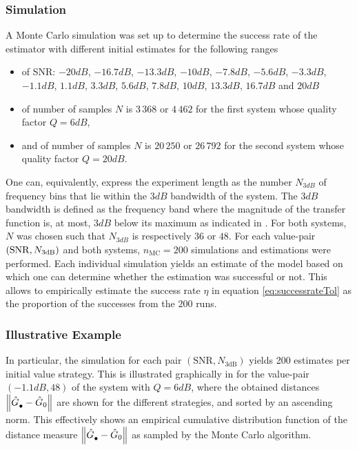 \subsubsection{Simulation}
A Monte Carlo simulation was set up to determine the success rate of the estimator with different initial estimates for the following ranges %
\begin{itemize}
\item of SNR: 
              $-20   \unit{dB}$, 
              $-16.7 \unit{dB}$, 
              $-13.3 \unit{dB}$, 
              $-10   \unit{dB}$, 
              $- 7.8 \unit{dB}$, 
              $- 5.6 \unit{dB}$, 
              $- 3.3 \unit{dB}$, 
              $- 1.1 \unit{dB}$, 
              $  1.1 \unit{dB}$, 
              $  3.3 \unit{dB}$, 
              $  5.6 \unit{dB}$, 
              $  7.8 \unit{dB}$, 
              $ 10   \unit{dB}$, 
              $ 13.3 \unit{dB}$, 
              $ 16.7 \unit{dB}$ and
              $ 20   \unit{dB}$
\item of number of samples $N$ is $3\,368$ or $4\,462$ for the first system whose quality factor $Q= 6 \unit{dB}$,
\item and of number of samples $N$ is $20\,250$ or $26\,792$ for the second system whose quality factor $Q = 20\unit{dB}$.
\end{itemize}
One can, equivalently, express the experiment length as the number $N_{3\unit{dB}}$ of frequency bins that lie within the $3\unit{dB}$ bandwidth of the system.
The $3\unit{dB}$ bandwidth is defined as the frequency band where the magnitude of the transfer function is, at most, $3\unit{dB}$ below its maximum as indicated in .
For both systems, $N$ was chosen such that $N_{3\unit{dB}}$ is respectively $36$ or $48$.
For each value-pair $(\mathrm{SNR}, N_{3\mathrm{dB}})$ and both systems, $n_{\mathrm{MC}} = 200$  simulations and estimations were performed.
Each individual simulation yields an estimate of the model based on which one can determine whether the estimation was successful or not.
This allows to empirically estimate the success rate $\eta$ in equation \eqref{eq:successrateTol} as the proportion of the successes from the $200$ runs.


\subsubsection{Illustrative Example}
In particular, the simulation for each pair $(\mathrm{SNR}, N_{3\mathrm{dB}})$ yields 200 estimates per initial value strategy.
This is illustrated graphically in  for the value-pair $(-1.1\unit{dB},48)$ of the system with $Q = 6 \unit{dB}$, where the obtained distances $\left\| \hat{G}_{\mathrm{\bullet}}^{\mathrm{}} - \hat{G}_{0} \right\|_{}$ are shown for the different strategies, and sorted by an ascending norm.
This effectively shows an empirical cumulative distribution function of the distance measure $\left\| \hat{G}_{\mathrm{\bullet}}^{\mathrm{}} - \hat{G}_{0} \right\|_{}$ as sampled by the Monte Carlo algorithm.%
 
